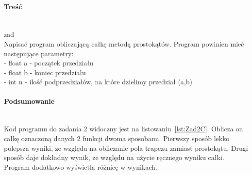 \paragraph{Treść}~\\
{zad}\\
Napisać program obliczającą całkę metodą prostokątów.
Program powinien mieć następujące parametry:\\
- float a - początek przedziału\\
- float b - koniec przedziału\\
- int n - ilość podprzedziałów, na które dzielimy przedział (a,b)



\paragraph{Podsumowanie}~\\
Kod programu do zadania 2 widoczny jest na listowaniu~\ref{lst:Zad2C}.
Oblicza on całkę oznaczoną danych 2 funkcji dwoma sposobami.
Pierwszy sposób lekko polepsza wyniki, ze względu na obliczanie pola trapezu zamiast prostokątu.
Drugi sposób daje dokładny wynik, ze względu na użycie ręcznego wyniku całki.
Program dodatkowo wyświetla różnicę w wynikach.
